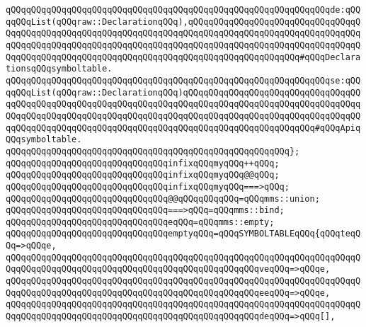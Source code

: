 \verb|qQQqqQQqqQQqqQQqqQQqqQQqqQQqqQQqqQQqqQQqqQQqqQQqqQQqqQQqqQQqqQQqde:qQQqqQQqList(qQQqraw::DeclarationqQQq),qQQqqQQqqQQqqQQqqQQqqQQqqQQqqQQqqQQqqQQqqQQqqQQqqQQqqQQqqQQqqQQqqQQqqQQqqQQqqQQqqQQqqQQqqQQqqQQqqQQqqQQqqQQqqQQqqQQqqQQqqQQqqQQqqQQqqQQqqQQqqQQqqQQqqQQqqQQqqQQqqQQqqQQqqQQqqQQqqQQqqQQqqQQqqQQqqQQqqQQqqQQqqQQqqQQqqQQqqQQqqQQqqQQqqQQq#qQQqDeclarationsqQQqsymboltable.|\newline
\verb|qQQqqQQqqQQqqQQqqQQqqQQqqQQqqQQqqQQqqQQqqQQqqQQqqQQqqQQqqQQqqQQqse:qQQqqQQqList(qQQqraw::DeclarationqQQq)qQQqqQQqqQQqqQQqqQQqqQQqqQQqqQQqqQQqqQQqqQQqqQQqqQQqqQQqqQQqqQQqqQQqqQQqqQQqqQQqqQQqqQQqqQQqqQQqqQQqqQQqqQQqqQQqqQQqqQQqqQQqqQQqqQQqqQQqqQQqqQQqqQQqqQQqqQQqqQQqqQQqqQQqqQQqqQQqqQQqqQQqqQQqqQQqqQQqqQQqqQQqqQQqqQQqqQQqqQQqqQQqqQQqqQQqqQQq#qQQqApiqQQqsymboltable.|\newline
\verb|qQQqqQQqqQQqqQQqqQQqqQQqqQQqqQQqqQQqqQQqqQQqqQQqqQQqqQQq};|\newline
\newline
\newline
\verb|qQQqqQQqqQQqqQQqqQQqqQQqqQQqqQQqinfixqQQqmyqQQq++qQQq;|\newline
\verb|qQQqqQQqqQQqqQQqqQQqqQQqqQQqqQQqinfixqQQqmyqQQq@@qQQq;|\newline
\verb|qQQqqQQqqQQqqQQqqQQqqQQqqQQqqQQqinfixqQQqmyqQQq===>qQQq;|\newline
\newline
\verb|qQQqqQQqqQQqqQQqqQQqqQQqqQQqqQQq@@qQQqqQQqqQQq=qQQqmms::union;|\newline
\verb|qQQqqQQqqQQqqQQqqQQqqQQqqQQqqQQq===>qQQq=qQQqmms::bind;|\newline
\newline
\newline
\verb|qQQqqQQqqQQqqQQqqQQqqQQqqQQqqQQqeqQQq=qQQqmms::empty;|\newline
\newline
\verb|qQQqqQQqqQQqqQQqqQQqqQQqqQQqqQQqemptyqQQq=qQQqSYMBOLTABLEqQQq{qQQqteqQQq=>qQQqe,|\newline
\verb|qQQqqQQqqQQqqQQqqQQqqQQqqQQqqQQqqQQqqQQqqQQqqQQqqQQqqQQqqQQqqQQqqQQqqQQqqQQqqQQqqQQqqQQqqQQqqQQqqQQqqQQqqQQqqQQqqQQqqQQqveqQQq=>qQQqe,|\newline
\verb|qQQqqQQqqQQqqQQqqQQqqQQqqQQqqQQqqQQqqQQqqQQqqQQqqQQqqQQqqQQqqQQqqQQqqQQqqQQqqQQqqQQqqQQqqQQqqQQqqQQqqQQqqQQqqQQqqQQqqQQqeeqQQq=>qQQqe,|\newline
\verb|qQQqqQQqqQQqqQQqqQQqqQQqqQQqqQQqqQQqqQQqqQQqqQQqqQQqqQQqqQQqqQQqqQQqqQQqqQQqqQQqqQQqqQQqqQQqqQQqqQQqqQQqqQQqqQQqqQQqqQQqdeqQQq=>qQQq[],|\newline
